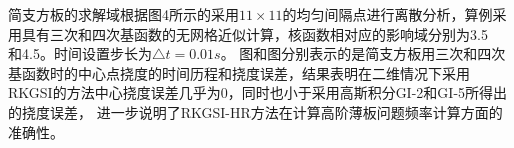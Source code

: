 \documentclass[a4paper]{article}
\begin{document}
\begin{figure}[!h]
\begin{floatrow}
\end{floatrow}
\end{figure}
简支方板的求解域根据图4所示的采用$11\times 11$的均匀间隔点进行离散分析，算例采用具有三次和四次基函数的无网格近似计算，核函数相对应的影响域分别为3.5\\和4.5。时间设置步长为$\triangle t=0.01s$。
图和图分别表示的是简支方板用三次和四次基函数时的中心点挠度的时间历程和挠度误差，结果表明在二维情况下采用RKGSI的方法中心挠度误差几乎为0，同时也小于采用高斯积分GI-2和GI-5所得出的挠度误差，
进一步说明了RKGSI-HR方法在计算高阶薄板问题频率计算方面的准确性。
\end{document}
